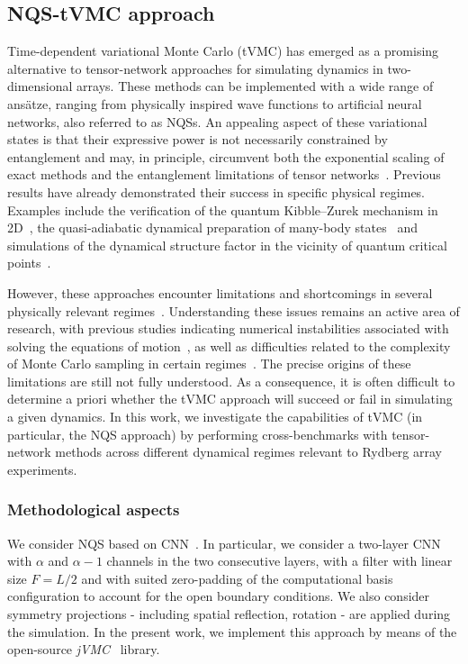 \documentclass[aps,pra,reprint,amssymb,superscriptaddress]{revtex4-2}
\begin{document}
\subsection{NQS-tVMC approach}
Time-dependent variational Monte Carlo (tVMC) has emerged as a promising alternative to tensor-network approaches for simulating dynamics in two-dimensional arrays. These methods can be implemented with a wide range of ansätze, ranging from physically inspired wave functions to artificial neural networks, also referred to as NQSs.
An appealing aspect of these variational states is that their expressive power is not necessarily constrained by entanglement and may, in principle, circumvent both the exponential scaling of exact methods and the entanglement limitations of tensor networks~\cite{carleo_localization_2012,carleo_solving_2017,levine_quantum_2019,sharir_neural_2022}. Previous results have already demonstrated their success in specific physical regimes. Examples include the verification of the quantum Kibble–Zurek mechanism in 2D~\cite{schmitt_quantum_2022}, the quasi-adiabatic dynamical preparation of many-body states~\cite{carleo_simulating_2024,mendes-santos_wave-function_2024,mauron_predicting_2025} and simulations of the dynamical structure factor in the vicinity of quantum critical points~\cite{mendes-santos_highly_2023}.

However, these approaches encounter limitations and shortcomings in several physically relevant regimes~\cite{schmitt_simulating_2025}. Understanding  these issues remains an active area of research, with previous studies indicating numerical instabilities associated with solving the equations of motion~\cite{schmitt_quantum_2020}, as well as difficulties related to the complexity of Monte Carlo sampling in certain regimes~\cite{sinibaldi_unbiasing_2023}. The precise origins of these limitations are still not fully understood. As a consequence, it is often difficult to determine a priori whether the tVMC approach will succeed or fail in simulating a given dynamics. In this work, we investigate the capabilities of tVMC (in particular, the NQS approach) by performing cross-benchmarks with tensor-network methods across different dynamical regimes relevant to Rydberg array experiments.

\subsubsection{Methodological aspects}

We consider NQS based on CNN~\cite{schmitt_quantum_2020}. In particular, we consider a two-layer CNN with $\alpha$ and $\alpha -1 $ channels in the two consecutive layers, with a filter with linear size $F = L/2$ and with 
suited zero-padding of the computational basis configuration to account for the open boundary
conditions. We also consider symmetry projections - including spatial reflection,
rotation - are applied during the simulation.
In the present work, we implement this approach by means of the open-source \textit{jVMC}~\cite{schmitt_jvmc_2022} library.
\end{document}
